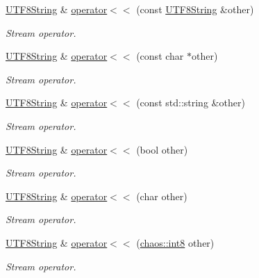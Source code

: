 \begin{DoxyCompactItemize}
\hyperlink{classchaos_1_1str_1_1_u_t_f8_string}{U\+T\+F8\+String} \& \hyperlink{classchaos_1_1str_1_1_u_t_f8_string_a3ab14e1ddffbadd664ebd4f228d11f17}{operator$<$$<$} (const \hyperlink{classchaos_1_1str_1_1_u_t_f8_string}{U\+T\+F8\+String} \&other)
\begin{DoxyCompactList}\small\item\em Stream operator. \end{DoxyCompactList}\item 
\hyperlink{classchaos_1_1str_1_1_u_t_f8_string}{U\+T\+F8\+String} \& \hyperlink{classchaos_1_1str_1_1_u_t_f8_string_ac3ca865b7f68b13b4b5902793bbb750d}{operator$<$$<$} (const char $\ast$other)
\begin{DoxyCompactList}\small\item\em Stream operator. \end{DoxyCompactList}\item 
\hyperlink{classchaos_1_1str_1_1_u_t_f8_string}{U\+T\+F8\+String} \& \hyperlink{classchaos_1_1str_1_1_u_t_f8_string_a083f1107b391e5b4854ff40bc09c1406}{operator$<$$<$} (const std\+::string \&other)
\begin{DoxyCompactList}\small\item\em Stream operator. \end{DoxyCompactList}\item 
\hyperlink{classchaos_1_1str_1_1_u_t_f8_string}{U\+T\+F8\+String} \& \hyperlink{classchaos_1_1str_1_1_u_t_f8_string_a9ef346ef5d7211de67578ce4bcc4a122}{operator$<$$<$} (bool other)
\begin{DoxyCompactList}\small\item\em Stream operator. \end{DoxyCompactList}\item 
\hyperlink{classchaos_1_1str_1_1_u_t_f8_string}{U\+T\+F8\+String} \& \hyperlink{classchaos_1_1str_1_1_u_t_f8_string_a1fe072a86408b3eb0b3fdfe9f80e3b8d}{operator$<$$<$} (char other)
\begin{DoxyCompactList}\small\item\em Stream operator. \end{DoxyCompactList}\item 
\hyperlink{classchaos_1_1str_1_1_u_t_f8_string}{U\+T\+F8\+String} \& \hyperlink{classchaos_1_1str_1_1_u_t_f8_string_a89937311871b473ed17bd83622e60530}{operator$<$$<$} (\hyperlink{namespacechaos_a56015674cfe4ad1fc583c3da6c724d8a}{chaos\+::int8} other)
\begin{DoxyCompactList}\small\item\em Stream operator. \end{DoxyCompactList}\item 

\end{DoxyCompactItemize}
